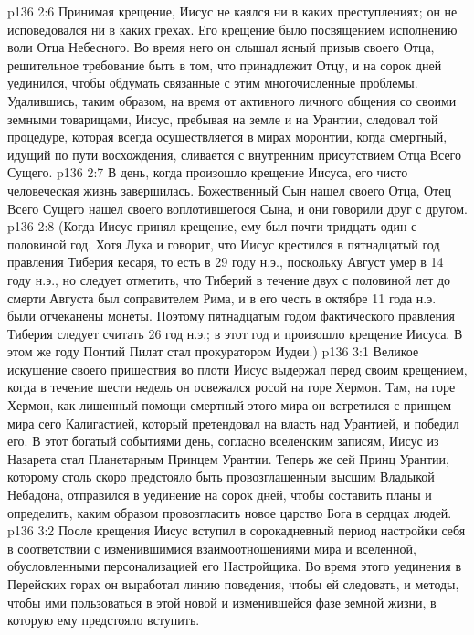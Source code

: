 \vs p136 2:6 \pc Принимая крещение, Иисус не каялся ни в каких преступлениях; он не исповедовался ни в каких грехах. Его крещение было посвящением исполнению воли Отца Небесного. Во время него он слышал ясный призыв своего Отца, решительное требование быть в том, что принадлежит Отцу, и на сорок дней уединился, чтобы обдумать связанные с этим многочисленные проблемы. Удалившись, таким образом, на время от активного личного общения со своими земными товарищами, Иисус, пребывая на земле и на Урантии, следовал той процедуре, которая всегда осуществляется в мирах моронтии, когда смертный, идущий по пути восхождения, сливается с внутренним присутствием Отца Всего Сущего.
\vs p136 2:7 В день, когда произошло крещение Иисуса, его чисто человеческая жизнь завершилась. Божественный Сын нашел своего Отца, Отец Всего Сущего нашел своего воплотившегося Сына, и они говорили друг с другом.
\vs p136 2:8 \pc (Когда Иисус принял крещение, ему был почти тридцать один с половиной год. Хотя Лука и говорит, что Иисус крестился в пятнадцатый год правления Тиберия кесаря, то есть в 29 году н.э., поскольку Август умер в 14 году н.э., но следует отметить, что Тиберий в течение двух с половиной лет до смерти Августа был соправителем Рима, и в его честь в октябре 11 года н.э. были отчеканены монеты. Поэтому пятнадцатым годом фактического правления Тиберия следует считать 26 год н.э.; в этот год и произошло крещение Иисуса. В этом же году Понтий Пилат стал прокуратором Иудеи.)
\vs p136 3:1 Великое искушение своего пришествия во плоти Иисус выдержал перед своим крещением, когда в течение шести недель он освежался росой на горе Хермон. Там, на горе Хермон, как лишенный помощи смертный этого мира он встретился с принцем мира сего Калигастией, который претендовал на власть над Урантией, и победил его. В этот богатый событиями день, согласно вселенским записям, Иисус из Назарета стал Планетарным Принцем Урантии. Теперь же сей Принц Урантии, которому столь скоро предстояло быть провозглашенным высшим Владыкой Небадона, отправился в уединение на сорок дней, чтобы составить планы и определить, каким образом провозгласить новое царство Бога в сердцах людей.
\vs p136 3:2 После крещения Иисус вступил в сорокадневный период настройки себя в соответствии с изменившимися взаимоотношениями мира и вселенной, обусловленными персонализацией его Настройщика. Во время этого уединения в Перейских горах он выработал линию поведения, чтобы ей следовать, и методы, чтобы ими пользоваться в этой новой и изменившейся фазе земной жизни, в которую ему предстояло вступить.

